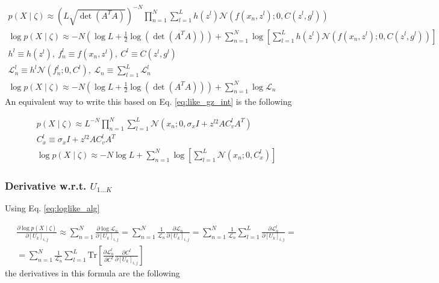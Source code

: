 \documentclass{paper}
\begin{document}
\begin{eqnarray}
p(X \mid \zeta) \approx \left( L \sqrt{\det(A^TA)} \right)^{-N} \prod_{n=1}^N \sum_{l=1}^{L} h(z^l) \mathcal{N}(f(x_n,z^l);0,C(z^l,g^l)) \\
\log p(X \mid \zeta) \approx -N (\log L + \frac{1}{2}\log(\det(A^TA))) + \sum_{n=1}^N \log \left[ \sum_{l=1}^{L} h(z^l) \mathcal{N}(f(x_n,z^l);0,C(z^l,g^l)) \right] \\
h^l \equiv h(z^l), ~ f_n^l \equiv f(x_n,z^l), ~ C^l \equiv C(z^l,g^l) \\
\mathcal{L}_n^l \equiv h^l \mathcal{N}(f_n^l;0,C^l), ~ \mathcal{L}_n \equiv  \sum_{l=1}^{L} \mathcal{L}_n^l \\
\log p(X \mid \zeta) \approx -N (\log L + \frac{1}{2}\log(\det(A^TA))) + \sum_{n=1}^N \log \mathcal{L}_n \label{eq:loglike_alg}
\end{eqnarray}
%
An equivalent way to write this based on Eq. \ref{eq:like_gz_int} is the following

\begin{eqnarray}
p(X \mid \zeta) \approx L^{-N} \prod_{n=1}^N \sum_{l=1}^{L} \mathcal{N}(x_n;0,\sigma_x I + z^{l2} A C_v^l A^T) \\
C_x^l \equiv \sigma_x I + z^{l2} A C_v^l A^T \\
\log p(X \mid \zeta) \approx -N \log L + \sum_{n=1}^N \log \left[ \sum_{l=1}^{L} \mathcal{N}(x_n;0,C_x^l) \right] \label{eq:loglike_int}
\end{eqnarray}

\subsubsection{Derivative w.r.t. $U_{1\dots K}$ }

Using Eq. \ref{eq:loglike_alg}

\begin{equation}
\begin{split}
\frac{\partial \log p(X \mid \zeta)}{\partial \left[ U_k \right]_{i,j}} \approx \sum_{n=1}^N \frac{\partial \log \mathcal{L}_n}{\partial \left[ U_k \right]_{i,j}} = \sum_{n=1}^N \frac{1}{\mathcal{L}_n} \frac{\partial \mathcal{L}_n}{\partial \left[ U_k \right]_{i,j}} = \sum_{n=1}^N \frac{1}{\mathcal{L}_n}  \sum_{l=1}^{L} \frac{\partial \mathcal{L}_n^l}{\partial \left[ U_k \right]_{i,j}} = \\
=  \sum_{n=1}^N \frac{1}{\mathcal{L}_n}  \sum_{l=1}^{L} \textrm{Tr} \left[ \frac{\partial \mathcal{L}_n^l}{\partial C^l} \frac{\partial C^l}{\partial \left[ U_k \right]_{i,j}} \right]
\end{split}
\end{equation}
% 
the derivatives in this formula are the following
\end{document}
